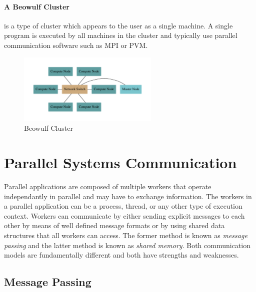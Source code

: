 \documentclass[11pt]{book}
\begin{document}
\paragraph{A Beowulf Cluster} is a type of cluster which appears to the user as a single
machine. A single program is executed by all machines in the cluster and typically use
parallel communication software such as MPI or PVM.

\begin{figure}[H]
    \centering
    \includegraphics[width=0.6\textwidth]{figs/graphviz/beowulf.pdf}
    \caption{Beowulf Cluster}\label{beowulf}
\end{figure}

\section{Parallel Systems Communication}

Parallel applications are composed of multiple workers that operate independantly in parallel
and may have to exchange information. The workers in a parallel application can be a process,
thread, or any other type of execution context. Workers can communicate by either sending
explicit messages to each other by means of well defined message formats or by using shared
data structures that all workers can access. The former method is known as \emph{message passing}
and the latter method is known as \emph{shared memory}. Both communication models are
fundamentally different and both have strengths and weaknesses.

\subsection{Message Passing}
\end{document}
